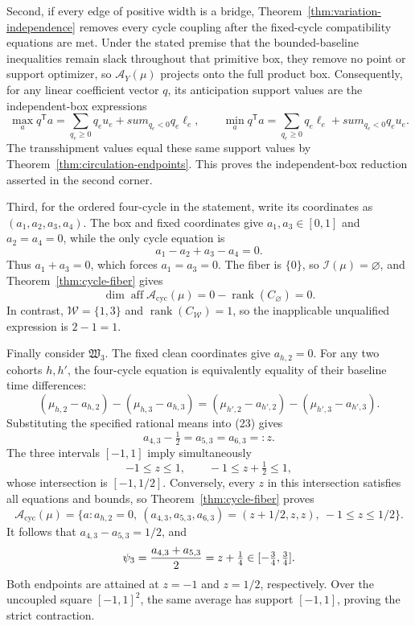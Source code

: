 Second, if every edge of positive width is a bridge, Theorem~\ref{thm:variation-independence} removes every cycle coupling after the fixed-cycle compatibility equations are met.  Under the stated premise that the bounded-baseline inequalities remain slack throughout that primitive box, they remove no point or support optimizer, so \(\mathcal A_Y(\mu)\) projects onto the full product box.  Consequently, for any linear coefficient vector \(q\), its anticipation support values are the independent-box expressions
\[
 \max_a q^{\mathsf T}a
 =\sum_{q_e\ge0}q_eu_e+sum_{q_e<0}q_e\ell_e,
 \qquad
 \min_a q^{\mathsf T}a
 =\sum_{q_e\ge0}q_e\ell_e+sum_{q_e<0}q_eu_e.
\]
The transshipment values equal these same support values by Theorem~\ref{thm:circulation-endpoints}.  This proves the independent-box reduction asserted in the second corner.

Third, for the ordered four-cycle in the statement, write its coordinates as \((a_1,a_2,a_3,a_4)\).  The box and fixed coordinates give \(a_1,a_3\in[0,1]\) and \(a_2=a_4=0\), while the only cycle equation is
\[
 a_1-a_2+a_3-a_4=0.
\]
Thus \(a_1+a_3=0\), which forces \(a_1=a_3=0\).  The fiber is \(\{0\}\), so \(\mathcal I(\mu)=\varnothing\), and Theorem~\ref{thm:cycle-fiber} gives
\[
 \dim\operatorname{aff}\mathcal A_{\mathrm{cyc}}(\mu)
 =0-\operatorname{rank}(C_{\varnothing})=0.
\]
In contrast, \(\mathcal W=\{1,3\}\) and \(\operatorname{rank}(C_{\mathcal W})=1\), so the inapplicable unqualified expression is \(2-1=1\).

Finally consider \(\mathfrak W_3\).  The fixed clean coordinates give \(a_{h,2}=0\).  For any two cohorts \(h,h'\), the four-cycle equation is equivalently equality of their baseline time differences:
\[
 (\mu_{h,2}-a_{h,2})-(\mu_{h,3}-a_{h,3})
 =(\mu_{h',2}-a_{h',2})-(\mu_{h',3}-a_{h',3}). \tag{23}
\]
Substituting the specified rational means into (23) gives
\[
 a_{4,3}-\tfrac12=a_{5,3}=a_{6,3}=:z.
\]
The three intervals \([-1,1]\) imply simultaneously
\[
 -1\le z\le1,
 \qquad -1\le z+\tfrac12\le1,
\]
whose intersection is \([-1,1/2]\).  Conversely, every \(z\) in this intersection satisfies all equations and bounds, so Theorem~\ref{thm:cycle-fiber} proves
\[
 \mathcal A_{\mathrm{cyc}}(\mu)
 =\{a:a_{h,2}=0,\ (a_{4,3},a_{5,3},a_{6,3})=(z+1/2,z,z),\ -1\le z\le1/2\}.
\]
It follows that \(a_{4,3}-a_{5,3}=1/2\), and
\[
 \psi_3={a_{4,3}+a_{5,3}\over2}=z+\tfrac14
 \in[-\tfrac34,\tfrac34].
\]
Both endpoints are attained at \(z=-1\) and \(z=1/2\), respectively.  Over the uncoupled square \([-1,1]^2\), the same average has support \([-1,1]\), proving the strict contraction.

